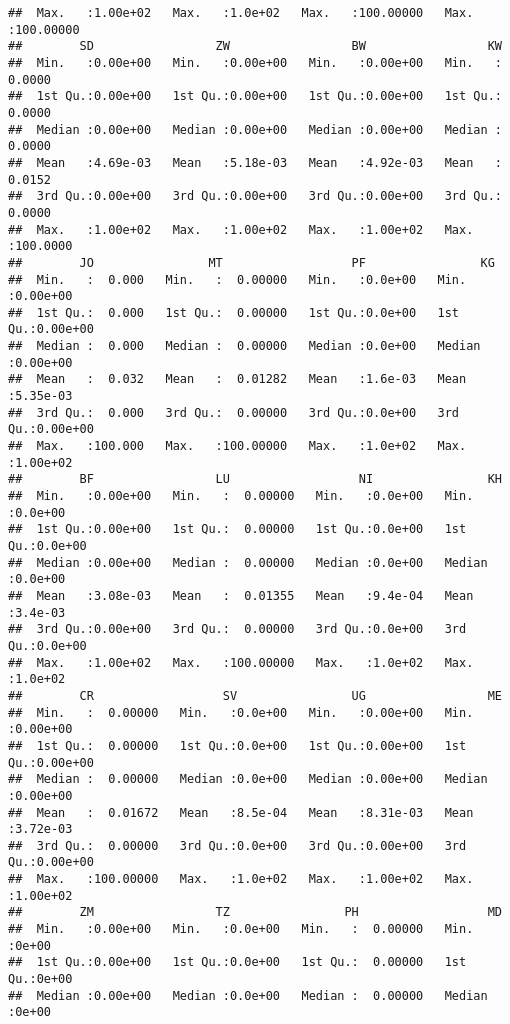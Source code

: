 \documentclass[
]{article}
\begin{document}
\begin{verbatim}
##  Max.   :1.00e+02   Max.   :1.0e+02   Max.   :100.00000   Max.   :100.00000  
##        SD                 ZW                 BW                 KW          
##  Min.   :0.00e+00   Min.   :0.00e+00   Min.   :0.00e+00   Min.   :  0.0000  
##  1st Qu.:0.00e+00   1st Qu.:0.00e+00   1st Qu.:0.00e+00   1st Qu.:  0.0000  
##  Median :0.00e+00   Median :0.00e+00   Median :0.00e+00   Median :  0.0000  
##  Mean   :4.69e-03   Mean   :5.18e-03   Mean   :4.92e-03   Mean   :  0.0152  
##  3rd Qu.:0.00e+00   3rd Qu.:0.00e+00   3rd Qu.:0.00e+00   3rd Qu.:  0.0000  
##  Max.   :1.00e+02   Max.   :1.00e+02   Max.   :1.00e+02   Max.   :100.0000  
##        JO                MT                  PF                KG          
##  Min.   :  0.000   Min.   :  0.00000   Min.   :0.0e+00   Min.   :0.00e+00  
##  1st Qu.:  0.000   1st Qu.:  0.00000   1st Qu.:0.0e+00   1st Qu.:0.00e+00  
##  Median :  0.000   Median :  0.00000   Median :0.0e+00   Median :0.00e+00  
##  Mean   :  0.032   Mean   :  0.01282   Mean   :1.6e-03   Mean   :5.35e-03  
##  3rd Qu.:  0.000   3rd Qu.:  0.00000   3rd Qu.:0.0e+00   3rd Qu.:0.00e+00  
##  Max.   :100.000   Max.   :100.00000   Max.   :1.0e+02   Max.   :1.00e+02  
##        BF                 LU                  NI                KH         
##  Min.   :0.00e+00   Min.   :  0.00000   Min.   :0.0e+00   Min.   :0.0e+00  
##  1st Qu.:0.00e+00   1st Qu.:  0.00000   1st Qu.:0.0e+00   1st Qu.:0.0e+00  
##  Median :0.00e+00   Median :  0.00000   Median :0.0e+00   Median :0.0e+00  
##  Mean   :3.08e-03   Mean   :  0.01355   Mean   :9.4e-04   Mean   :3.4e-03  
##  3rd Qu.:0.00e+00   3rd Qu.:  0.00000   3rd Qu.:0.0e+00   3rd Qu.:0.0e+00  
##  Max.   :1.00e+02   Max.   :100.00000   Max.   :1.0e+02   Max.   :1.0e+02  
##        CR                  SV                UG                 ME          
##  Min.   :  0.00000   Min.   :0.0e+00   Min.   :0.00e+00   Min.   :0.00e+00  
##  1st Qu.:  0.00000   1st Qu.:0.0e+00   1st Qu.:0.00e+00   1st Qu.:0.00e+00  
##  Median :  0.00000   Median :0.0e+00   Median :0.00e+00   Median :0.00e+00  
##  Mean   :  0.01672   Mean   :8.5e-04   Mean   :8.31e-03   Mean   :3.72e-03  
##  3rd Qu.:  0.00000   3rd Qu.:0.0e+00   3rd Qu.:0.00e+00   3rd Qu.:0.00e+00  
##  Max.   :100.00000   Max.   :1.0e+02   Max.   :1.00e+02   Max.   :1.00e+02  
##        ZM                 TZ                PH                  MD       
##  Min.   :0.00e+00   Min.   :0.0e+00   Min.   :  0.00000   Min.   :0e+00  
##  1st Qu.:0.00e+00   1st Qu.:0.0e+00   1st Qu.:  0.00000   1st Qu.:0e+00  
##  Median :0.00e+00   Median :0.0e+00   Median :  0.00000   Median :0e+00  

\end{verbatim}
\end{document}
